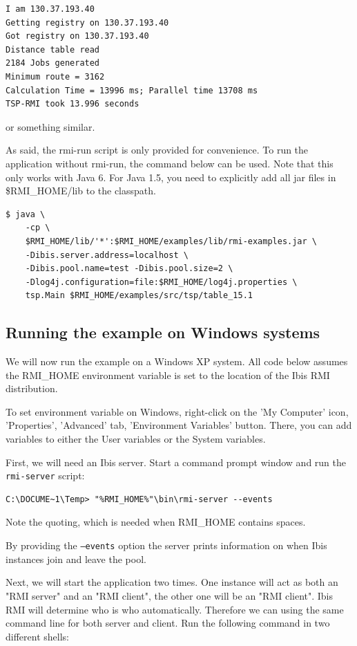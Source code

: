 \documentclass[a4paper,10pt]{article}
\begin{document}
\noindent
{\small
\begin{verbatim}
I am 130.37.193.40
Getting registry on 130.37.193.40
Got registry on 130.37.193.40
Distance table read
2184 Jobs generated
Minimum route = 3162
Calculation Time = 13996 ms; Parallel time 13708 ms
TSP-RMI took 13.996 seconds
\end{verbatim}
}
\noindent

or something similar.

As said, the rmi-run script is only provided for convenience. To run
the application without rmi-run, the command below can be used.
Note that this only works with Java 6. For Java 1.5, you need to
explicitly add all jar files in \$RMI\_HOME/lib to the classpath.

\noindent
{\small
\begin{verbatim}
$ java \
    -cp \
    $RMI_HOME/lib/'*':$RMI_HOME/examples/lib/rmi-examples.jar \
    -Dibis.server.address=localhost \
    -Dibis.pool.name=test -Dibis.pool.size=2 \
    -Dlog4j.configuration=file:$RMI_HOME/log4j.properties \
    tsp.Main $RMI_HOME/examples/src/tsp/table_15.1
\end{verbatim}
}
\noindent

\subsection{Running the example on Windows systems}

We will now run the example on a Windows XP system.
All code below assumes the RMI\_HOME
environment variable is set to the location of the Ibis RMI distribution.

To set environment variable on Windows, right-click on the 'My Computer' icon,
'Properties', 'Advanced' tab, 'Environment Variables' button. There, you
can add variables to either the User variables or the System variables.

First, we will need an Ibis server. Start a command prompt window and
run the \texttt{rmi-server} script:
\noindent
{\small
\begin{verbatim}
C:\DOCUME~1\Temp> "%RMI_HOME%"\bin\rmi-server --events
\end{verbatim}
}
\noindent

Note the quoting, which is needed when RMI\_HOME contains spaces.

By providing the \texttt{--events} option the server
prints information on when Ibis instances join and leave the pool.

Next, we will start the application two times. One instance will act as both an
"RMI server" and an "RMI client", the other one will be an "RMI client".
Ibis RMI will determine who is who automatically. Therefore we can using the
same command line for both server and client.
Run the following command in two different shells:
\end{document}
